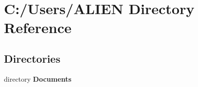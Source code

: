 \section{C\+:/\+Users/\+A\+L\+I\+EN Directory Reference}
\label{dir_b294f2ea6577d00266ff690c71b27031}
\subsection*{Directories}
\begin{DoxyCompactItemize}
\item 
directory {\bf Documents}
\end{DoxyCompactItemize}
